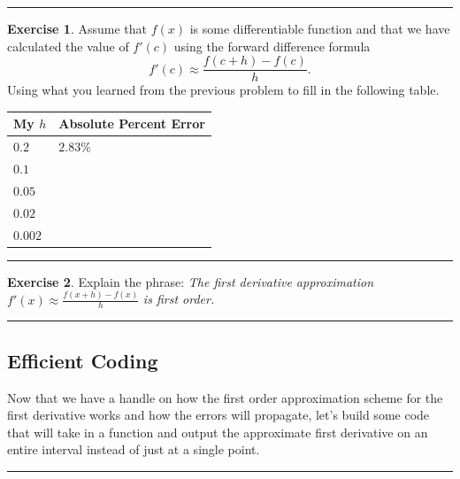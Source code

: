 \documentclass[
]{book}
\theoremstyle{definition}
\theoremstyle{definition}
\theoremstyle{definition}
\newtheorem{exercise}{Exercise}[chapter]
\theoremstyle{remark}
\begin{document}
\begin{center}\rule{0.5\linewidth}{0.5pt}\end{center}

\begin{exercise}
\protect\hypertarget{exr:unnamed-chunk-149}{}{\label{exr:unnamed-chunk-149} }Assume that \(f(x)\) is some differentiable function and that we have
calculated the value of \(f'(c)\) using the forward difference formula
\[f'(c) \approx \frac{f(c+h) - f(c)}{h}.\] Using what you learned from
the previous problem to fill in the following table.

\begin{longtable}[]{@{}ll@{}}
\toprule
My \(h\) & Absolute Percent Error\tabularnewline
\midrule
\endhead
\(0.2\) & \(2.83\%\)\tabularnewline
\(0.1\) &\tabularnewline
\(0.05\) &\tabularnewline
\(0.02\) &\tabularnewline
\(0.002\) &\tabularnewline
\bottomrule
\end{longtable}
\end{exercise}

\begin{center}\rule{0.5\linewidth}{0.5pt}\end{center}

\begin{exercise}
\protect\hypertarget{exr:unnamed-chunk-150}{}{\label{exr:unnamed-chunk-150} }Explain the phrase: \emph{The first derivative approximation} \(f'(x) \approx \frac{f(x+h)-f(x)}{h}\) \emph{is first order.}
\end{exercise}

\begin{center}\rule{0.5\linewidth}{0.5pt}\end{center}

\hypertarget{efficient-coding}{%
\subsection{Efficient Coding}\label{efficient-coding}}

Now that we have a handle on how the first order approximation scheme for the first derivative works and how the errors will propagate, let's build some code that will take in a function and output the approximate first derivative on an entire interval instead of just at a single point.

\begin{center}\rule{0.5\linewidth}{0.5pt}\end{center}
\end{document}
